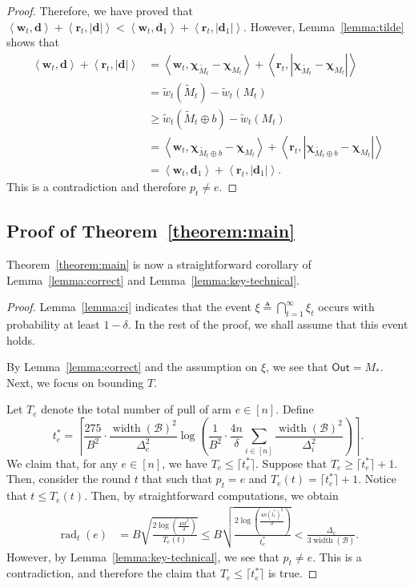 \documentclass{article}
\newcommand{\B}{\mathcal B}
\DeclareMathOperator{\rank}{width}
\DeclareMathOperator{\rad}{rad}
\newcommand{\out}{\mathsf{Out}}
\newcommand{\inn}[1]{\left\langle #1 \right\rangle}
\renewcommand{\vec}[1]{\boldsymbol{#1}}
\begin{document}
\begin{spacing}{1.1}
\begin{proof}
Therefore, we have proved that $\inn{\vec w_t, \vec d}+\inn{\vec r_t,  |\vec d|} < \inn{\vec w_t, \vec d_1}+\inn{\vec r_t, |\vec d_1|}.
$
However, Lemma~\ref{lemma:tilde} shows that 
\begin{align*}
\inn{\vec w_t, \vec d}+\inn{\vec r_t,  |\vec d|} 
&= \inn{\vec w_t, \vec \chi_{\tilde M_t} - \vec \chi_{M_t}}+\inn{\vec r_t,  |\vec \chi_{\tilde M_t} - \vec \chi_{M_t}|} \\
&= \tilde w_t(\tilde M_t) - \tilde w_t(M_t)\\
& \ge \tilde w_t(\tilde M_t \oplus b)-\tilde w_t(M_t)\\
&= \inn{\vec w_t, \vec \chi_{\tilde M_t \oplus b} - \vec \chi_{M_t}}+\inn{\vec r_t,  |\vec \chi_{\tilde M_t \oplus b} - \vec \chi_{M_t}|} \\
&= \inn{\vec w_t, \vec d_1}+\inn{\vec r_t,  |\vec d_1|}. 
\end{align*}
This is a contradiction and therefore $p_t\not= e$.

\end{proof}


\subsection{Proof of Theorem~\ref{theorem:main}}

Theorem~\ref{theorem:main} is now a straightforward corollary of Lemma~\ref{lemma:correct} and Lemma~\ref{lemma:key-technical}.
\begin{proof}
Lemma~\ref{lemma:ci} indicates that the event $\xi \triangleq \bigcap_{t=1}^\infty \xi_t$ occurs with probability at least $1-\delta$.
In the rest of the proof, we shall assume that this event holds.

By Lemma~\ref{lemma:correct} and the assumption on $\xi$, we see that $\out=M_*$.
Next, we focus on bounding $T$.


Let $T_e$ denote the total number of pull of arm $e\in [n]$.
Define 
$$
t_e^* = \left\lceil\frac{275}{B^2}\cdot\frac{\rank(\B)^2}{\Delta_e^2}\log\left(\frac{1}{B^2}\cdot\frac{4n}{\delta}\sum_{i\in[n]}\frac{\rank(\B)^2}{\Delta_i^2}\right)\right\rceil.
$$
We claim that, for any $e \in [n]$, we have $T_e \le \lceil t_e^* \rceil$.
Suppose that $T_e \ge \lceil t_e^* \rceil+1$.
Then, consider the round $t$ that such that $p_t=e$ and $T_e(t) =  \lceil t_e^* \rceil+1$.
Notice that $t \le T_e(t)$.
Then, by straightforward computations, we obtain
\begin{align*}
\rad_t(e) &=   B\sqrt{\frac{2\log\left(\frac{4n t^2}\delta\right)}{T_e(t)}} \le
 B\sqrt{\frac{2\log\left(\frac{4n (t_e^*)^2}\delta\right)}{t_e^*}} <  \frac{\Delta_e}{3\rank(\B)}. 	
\end{align*}
However, by Lemma~\ref{lemma:key-technical}, we see that $p_t\not=e$. This is a contradiction, and therefore the claim that $T_e \le \lceil t_e^* \rceil$ is true.


\end{proof}
\end{spacing}
\end{document}
